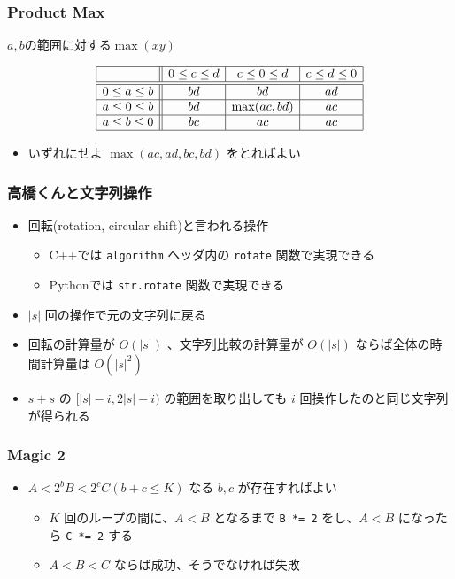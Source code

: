 \documentclass[t, aspectratio=169, dvipdfmx]{beamer}
\begin{document}
\begin{frame}
  \frametitle{Product Max}
  \begin{table}[t]
    \caption{$a,b$の範囲に対する$\max(xy)$}
    $$\begin{array}{|c||c|c|c|} \hline
      & 0 \leq c \leq d & c \leq 0 \leq d & c \leq d \leq 0 \\ \hline\hline
      0 \leq a \leq b & bd & bd & ad \\ \hline
      a \leq 0 \leq b & bd & \max(ac,bd) & ac \\ \hline
      a \leq b \leq 0 & bc & ac & ac \\ \hline
    \end{array}$$
  \end{table}
  \begin{itemize}
    \item いずれにせよ $\max(ac,ad,bc,bd)$ をとればよい
  \end{itemize}
\end{frame}

\begin{frame}[containsverbatim]
  \frametitle{高橋くんと文字列操作}
  \begin{itemize}
    \item 回転(rotation, circular shift)と言われる操作
    \begin{itemize}
      \item C++では \verb|algorithm| ヘッダ内の \verb|rotate| 関数で実現できる
      \item Pythonでは \verb|str.rotate| 関数で実現できる
    \end{itemize}
    \item $|s|$ 回の操作で元の文字列に戻る
    \item 回転の計算量が $O(|s|)$ 、文字列比較の計算量が $O(|s|)$ ならば全体の時間計算量は $O(|s|^2)$
    \item $s+s$ の $[|s|-i, 2|s|-i)$ の範囲を取り出しても $i$ 回操作したのと同じ文字列が得られる
  \end{itemize}
\end{frame}

\begin{frame}[containsverbatim]
  \frametitle{Magic 2}
  \begin{itemize}
    \item $A < 2^b B < 2^c C (b+c \leq K)$ なる $b,c$ が存在すればよい
    \begin{itemize}
      \item $K$ 回のループの間に、$A<B$ となるまで \verb|B *= 2| をし、$A<B$ になったら \verb|C *= 2| する
      \item $A<B<C$ ならば成功、そうでなければ失敗
    \end{itemize}
  \end{itemize}
\end{frame}
\end{document}
